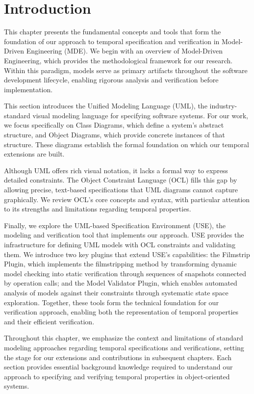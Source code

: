 \setlength{\parindent}{1cm}

\section{Introduction}

\hspace{1cm} This chapter presents the fundamental concepts and tools that form the 
foundation of our approach to temporal specification and verification in Model-Driven 
Engineering (MDE). We begin with an overview of Model-Driven Engineering, which 
provides the methodological framework for our research. Within this paradigm, models 
serve as primary artifacts throughout the software development lifecycle, enabling 
rigorous analysis and verification before implementation.

This section introduces the Unified Modeling Language (UML), the industry-standard 
visual modeling language for specifying software systems. For our work, we focus 
specifically on Class Diagrams, which define a system’s abstract structure, and 
Object Diagrams, which provide concrete instances of that structure. These diagrams 
establish the formal foundation on which our temporal extensions are built.

Although UML offers rich visual notation, it lacks a formal way to express detailed 
constraints. The Object Constraint Language (OCL) fills this gap by allowing precise, 
text-based specifications that UML diagrams cannot capture graphically. We review 
OCL's core concepts and syntax, with particular attention to its strengths and 
limitations regarding temporal properties.

Finally, we explore the UML-based Specification Environment (USE), the modeling and 
verification tool that implements our approach. USE provides the infrastructure for 
defining UML models with OCL constraints and validating them. We introduce two key 
plugins that extend USE's capabilities: the Filmstrip Plugin, which implements the 
filmstripping method by transforming dynamic model checking into static verification 
through sequences of snapshots connected by operation calls; and the Model Validator 
Plugin, which enables automated analysis of models against their constraints through 
systematic state space exploration. Together, these tools form the technical foundation 
for our verification approach, enabling both the representation of temporal properties 
and their efficient verification.

Throughout this chapter, we emphasize the context and limitations of standard 
modeling approaches regarding temporal specifications and verifications, setting the stage for our 
extensions and contributions in subsequent chapters. Each section provides essential 
background knowledge required to understand our approach to specifying and verifying 
temporal properties in object-oriented systems.
